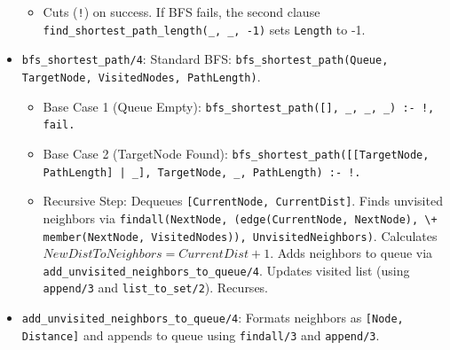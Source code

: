 \documentclass[12pt,a4paper]{article}
\begin{document}
\begin{itemize}
\begin{itemize}
\item Cuts (\texttt{!}) on success. If BFS fails, the second clause \texttt{find\_shortest\_path\_length(\_, \_, -1)} sets \texttt{Length} to -1.
\end{itemize}
\item \texttt{bfs\_shortest\_path/4}: Standard BFS: \texttt{bfs\_shortest\_path(Queue, TargetNode, VisitedNodes, PathLength)}.
\begin{itemize}
\item Base Case 1 (Queue Empty): \texttt{bfs\_shortest\_path([], \_, \_, \_) :- !, fail.}
\item Base Case 2 (TargetNode Found): \texttt{bfs\_shortest\_path([[TargetNode, PathLength] | \_], TargetNode, \_, PathLength) :- !.}
\item Recursive Step: Dequeues \texttt{[CurrentNode, CurrentDist]}. Finds unvisited neighbors via \texttt{findall(NextNode, (edge(CurrentNode, NextNode), \textbackslash+ member(NextNode, VisitedNodes)), UnvisitedNeighbors)}. Calculates $NewDistToNeighbors = CurrentDist + 1$. 
 Adds neighbors to queue via \texttt{add\_unvisited\_neighbors\_to\_queue/4}. Updates visited list (using \texttt{append/3} and \texttt{list\_to\_set/2}). Recurses.
\end{itemize}
\item \texttt{add\_unvisited\_neighbors\_to\_queue/4}: Formats neighbors as \texttt{[Node, Distance]} and appends to queue using \texttt{findall/3} and \texttt{append/3}.
\end{itemize}
\end{document}

